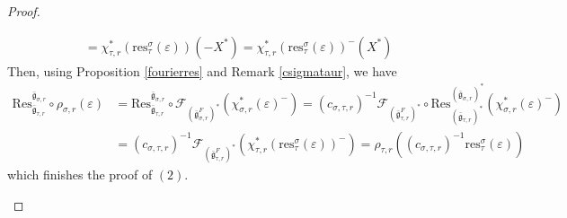 \documentclass[11 pt]{article}
\numberwithin{equation}{subsection}
\theoremstyle{definition}
\theoremstyle{remark}
\theoremstyle{conjecture}
\newcommand{\bg}{\bar{\mathfrak g}}
\newcommand{\Res}{\mathrm{Res}}
\newcommand{\res}{\mathrm{res}}
\newcommand{\mcF}{\mathcal F}
\begin{document}
\begin{proof}
\begin{itemize}
\begin{align*}
        &=\chi_{\tau,r}^*(\res^\sigma_\tau(\varepsilon))(-X^*)= \chi_{\tau,r}^*(\res^\sigma_\tau(\varepsilon))^-(X^*)
    \end{align*}
    Then, using Proposition \ref{fourierres} and Remark \ref{csigmataur}, we have 
    \begin{align*}
         \Res^{\bg_{\sigma,r}}_{\bg_{\tau,r}}\circ\rho_{\sigma,r}(\varepsilon)&=\Res^{\bg_{\sigma,r}}_{\bg_{\tau,r}}\circ\mcF_{(\bg_{\sigma,r}^F)^*}(\chi_{\sigma,r}^*(\varepsilon)^-)= ( c_{\sigma,\tau,r})^{-1} \mcF_{(\bg_{\tau,r}^F)^*}\circ \mathrm{Res}^{(\bg_{\sigma,r})^*}_{(\bg_{\tau,r})^*}(\chi_{\sigma,r}^*(\varepsilon)^-)\\
         &= ( c_{\sigma,\tau,r})^{-1} \mcF_{(\bg_{\tau,r}^F)^*}(\chi_{\tau,r}^*(\res^\sigma_\tau(\varepsilon))^-)=\rho_{\tau,r}(( c_{\sigma,\tau,r})^{-1}\res^\sigma_\tau(\varepsilon))
    \end{align*}
    which finishes the proof of $(2)$.


\end{itemize}
\end{proof}
\end{document}
